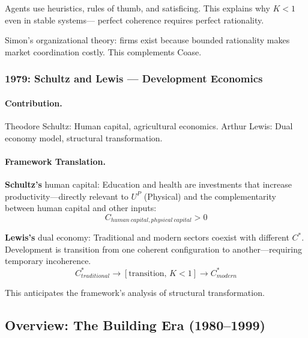 \documentclass[12pt,a4paper]{article}
\begin{document}
Agents use heuristics, rules of thumb, and satisficing.
This explains why $K < 1$ even in stable systems---
perfect coherence requires perfect rationality.

Simon's organizational theory: firms exist because bounded rationality
makes market coordination costly. This complements Coase.

\subsubsection{1979: Schultz and Lewis --- Development Economics}

\paragraph{Contribution.}
Theodore Schultz: Human capital, agricultural economics.
Arthur Lewis: Dual economy model, structural transformation.

\paragraph{Framework Translation.}
\textbf{Schultz's} human capital: Education and health are investments
that increase productivity---directly relevant to $U^P$ (Physical) and
the complementarity between human capital and other inputs:
\begin{equation}
  C_{human\ capital, physical\ capital} > 0
\end{equation}

\textbf{Lewis's} dual economy: Traditional and modern sectors coexist
with different $C^*$. Development is transition from one coherent
configuration to another---requiring temporary incoherence.
\begin{equation}
  C^*_{traditional} \to [\text{transition, } K < 1] \to C^*_{modern}
\end{equation}

This anticipates the framework's analysis of structural transformation.

\subsection{Overview: The Building Era (1980--1999)}
\end{document}
